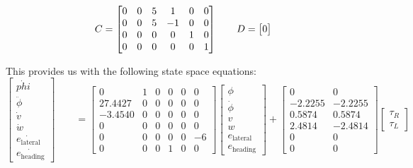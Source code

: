 \documentclass{article}
\begin{document}
\begin{equation*}
    C = \begin{bmatrix}
0& 0& 5&1& 0&  0\\
0&0& 5& -1&0& 0\\
0& 0& 0& 0& 1&  0\\
0& 0& 0& 0& 0&  1
\end{bmatrix} \qquad 
D = 
\begin{bmatrix}
    0
\end{bmatrix}\\
\end{equation*}

This provides us with the following state space equations:
\begin{equation*}
\begin{bmatrix}
\dot{phi}\\
\ddot{\phi}\\
\dot{v}\\
\dot{w}\\
\dot{e_\text{lateral}}\\
\dot{e_\text{heading}}
\end{bmatrix} \qquad
=
\begin{bmatrix}
0 & 1 & 0 & 0 & 0 & 0\\
    27.4427 & 0 & 0 & 0 & 0 & 0\\
    -3.4540 & 0 & 0 & 0 & 0 & 0\\
    0 & 0 & 0 & 0 & 0 & 0\\
    0 & 0 & 0 & 0 & 0 & -6\\
    0 & 0 & 0 & 1 & 0 & 0
\end{bmatrix}
\begin{bmatrix} 
\phi \\
\dot{\phi}\\
v\\
w\\
e_\text{lateral} \\
e_\text{heading}
\end{bmatrix}
+
\begin{bmatrix}
 0 & 0\\ -2.2255 &  -2.2255\\
    0.5874  &  0.5874\\
    2.4814  & -2.4814\\ 0& 0\\ 0 & 0
    \end{bmatrix}
    \begin{bmatrix}
    \tau_{R}\\
\tau_{L}
    \end{bmatrix}
\end{equation*}
\end{document}
